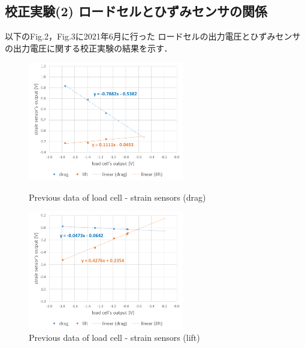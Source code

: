 \documentclass[twocolumn,a4j]{jsarticle}
\begin{document}
\newpage

\subsection{校正実験(2) ロードセルとひずみセンサの関係}
以下のFig.2，Fig.3に2021年6月に行った
ロードセルの出力電圧とひずみセンサの出力電圧に関する校正実験の結果を示す．

\begin{figure}[htbp]
    \footnotesize
    \begin{center}
        \includegraphics[width=68mm]{../images/graph_21119_drag_previous.png}
        \caption{Previous data of load cell - strain sensors (drag)}
        \includegraphics[width=68mm]{../images/graph_21119_lift_previous.png}
        \caption{Previous data of load cell - strain sensors (lift)}
    \end{center}
\end{figure}

\newpage
\end{document}
